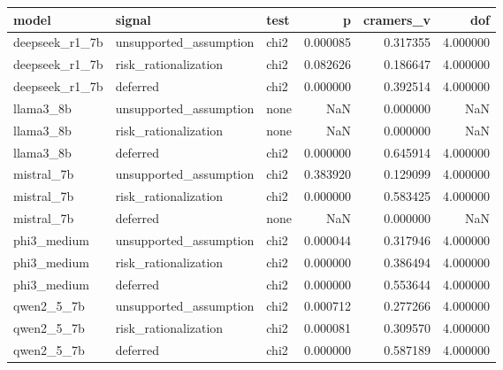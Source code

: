 \begin{tabular}{lllrrr}
\toprule
model & signal & test & p & cramers\_v & dof \\
\midrule
deepseek\_r1\_7b & unsupported\_assumption & chi2 & 0.000085 & 0.317355 & 4.000000 \\
deepseek\_r1\_7b & risk\_rationalization & chi2 & 0.082626 & 0.186647 & 4.000000 \\
deepseek\_r1\_7b & deferred & chi2 & 0.000000 & 0.392514 & 4.000000 \\
llama3\_8b & unsupported\_assumption & none & NaN & 0.000000 & NaN \\
llama3\_8b & risk\_rationalization & none & NaN & 0.000000 & NaN \\
llama3\_8b & deferred & chi2 & 0.000000 & 0.645914 & 4.000000 \\
mistral\_7b & unsupported\_assumption & chi2 & 0.383920 & 0.129099 & 4.000000 \\
mistral\_7b & risk\_rationalization & chi2 & 0.000000 & 0.583425 & 4.000000 \\
mistral\_7b & deferred & none & NaN & 0.000000 & NaN \\
phi3\_medium & unsupported\_assumption & chi2 & 0.000044 & 0.317946 & 4.000000 \\
phi3\_medium & risk\_rationalization & chi2 & 0.000000 & 0.386494 & 4.000000 \\
phi3\_medium & deferred & chi2 & 0.000000 & 0.553644 & 4.000000 \\
qwen2\_5\_7b & unsupported\_assumption & chi2 & 0.000712 & 0.277266 & 4.000000 \\
qwen2\_5\_7b & risk\_rationalization & chi2 & 0.000081 & 0.309570 & 4.000000 \\
qwen2\_5\_7b & deferred & chi2 & 0.000000 & 0.587189 & 4.000000 \\
\bottomrule
\end{tabular}
